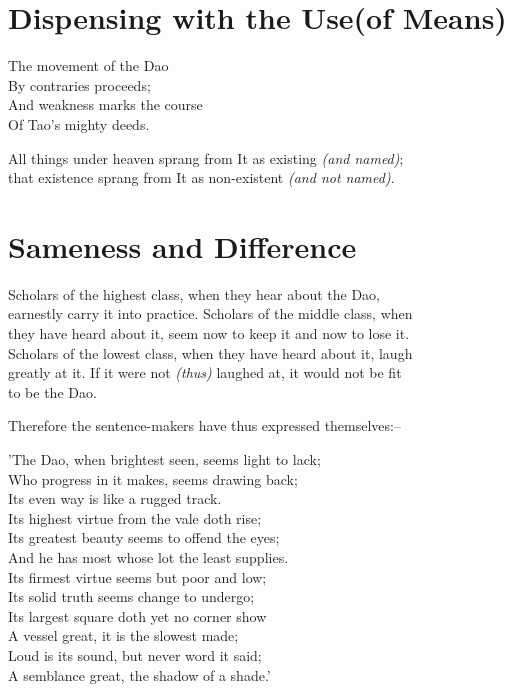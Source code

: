 \section*{Dispensing with the Use(of Means)}
    The movement of the Dao\\
    By contraries proceeds;\\
    And weakness marks the course\\
    Of Tao's mighty deeds.\vspace{\baselineskip}
    
    All things under heaven sprang from It as existing \textit{(and named)};\\
    that existence sprang from It as non-existent \textit{(and not named)}.\vspace{\baselineskip}
    
\section*{Sameness and Difference}
    Scholars of the highest class, when they hear about the Dao,\\
    earnestly carry it into practice. Scholars of the middle class, when\\
    they have heard about it, seem now to keep it and now to lose it.\\
    Scholars of the lowest class, when they have heard about it, laugh\\
    greatly at it. If it were not \textit{(thus)} laughed at, it would not be fit\\
    to be the Dao.\vspace{\baselineskip}
    
    Therefore the sentence-makers have thus expressed themselves:--\vspace{\baselineskip}
    
    
    'The Dao, when brightest seen, seems light to lack;\\
    Who progress in it makes, seems drawing back;\\
    Its even way is like a rugged track.\\
    Its highest virtue from the vale doth rise;\\
    Its greatest beauty seems to offend the eyes;\\
    And he has most whose lot the least supplies.\\
    Its firmest virtue seems but poor and low;\\
    Its solid truth seems change to undergo;\\
    Its largest square doth yet no corner show\\
    A vessel great, it is the slowest made;\\
    Loud is its sound, but never word it said;\\
    A semblance great, the shadow of a shade.'\vspace{\baselineskip}
    
